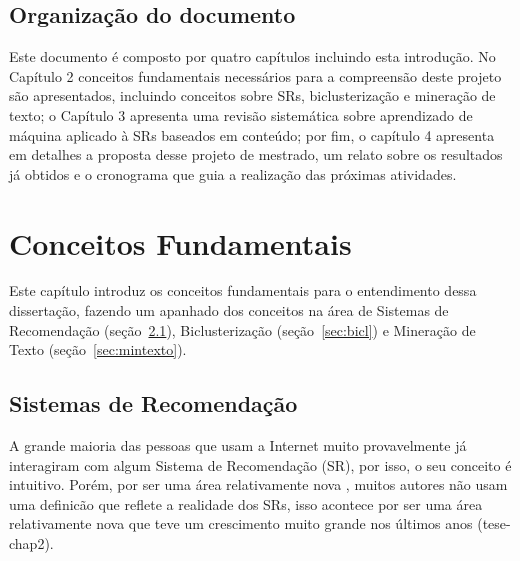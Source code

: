 \documentclass[normaltoc, espacoumemeio, pnumromarab,ruledheader]{abnt}
\begin{document}
\section{Organização do documento}

Este documento é composto por quatro capítulos incluindo esta introdução. No Capítulo 2 conceitos fundamentais necessários para a compreensão deste projeto são apresentados, incluindo conceitos sobre SRs, biclusterização e mineração de texto; o Capítulo 3 apresenta uma revisão sistemática sobre aprendizado de máquina aplicado à SRs baseados em conteúdo; por fim, o capítulo 4 apresenta em detalhes a proposta desse projeto de mestrado, um relato sobre os resultados já obtidos e o cronograma que guia a realização das próximas atividades.

\chapter{Conceitos Fundamentais}

Este capítulo introduz os conceitos fundamentais para o entendimento dessa dissertação, fazendo um apanhado dos conceitos na área de Sistemas de Recomendação (seção~\ref{sec:sr}), Biclusterização (seção~\ref{sec:bicl}) e Mineração de Texto (seção~\ref{sec:mintexto}).

\section{Sistemas de Recomendação}
\label{sec:sr}

A grande maioria das pessoas que usam a Internet muito provavelmente já interagiram com algum Sistema de Recomendação (SR), por isso, o seu conceito é intuitivo.
Porém, por ser uma área relativamente nova \cite{Lops2011}, muitos autores não usam uma definicão que reflete a realidade dos SRs, isso acontece por ser uma área relativamente nova que teve um crescimento muito grande nos últimos anos (tese-chap2).
\end{document}
